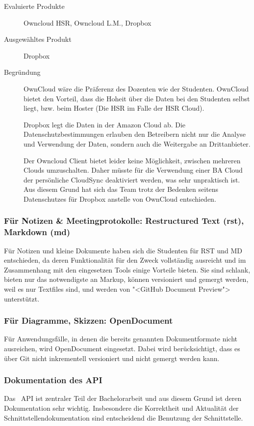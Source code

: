 				\begin{description}
					\item[Evaluierte Produkte] Owncloud HSR, Owncloud L.M., Dropbox
					\item[Ausgewähltes Produkt] Dropbox
					\item[Begründung] OwnCloud wäre die Präferenz des Dozenten wie der Studenten. 
						OwnCloud bietet den Vorteil, dass die Hoheit über die Daten bei den Studenten selbst liegt, bzw. beim Hoster (Die HSR im Falle der HSR Cloud).
						
						Dropbox legt die Daten in der Amazon Cloud ab. 
						Die Datenschutzbestimmungen erlauben den Betreibern nicht nur die Analyse und Verwendung der Daten, 
						sondern auch die Weitergabe an Drittanbieter.
						
						Der Owncloud Client bietet leider keine Möglichkeit, 
						zwischen mehreren Clouds umzuschalten. 
						Daher müsste für die Verwendung einer BA Cloud der persönliche CloudSync deaktiviert werden, 
						was sehr unpraktisch ist.						
						Aus diesem Grund hat sich das Team trotz der Bedenken seitens Datenschutzes für Dropbox anstelle von OwnCloud entschieden.
				\end{description}

			\subsubsection{Für Notizen \& Meetingprotokolle: Restructured Text (rst), Markdown (md)}
				Für Notizen und kleine Dokumente haben sich die Studenten für RST und MD entschieden, 
				da deren Funktionalität für den Zweck vollständig ausreicht und im Zusammenhang mit den eingesetzen Tools einige Vorteile bieten. 
				Sie sind schlank, bieten nur das notwendigste an Markup, können versioniert und gemergt werden,
				weil es nur Textfiles sind, und werden von "<GitHub Document Preview"> unterstützt.

			\subsubsection{Für Diagramme, Skizzen: OpenDocument}
				Für Anwendungsfälle, in denen die bereits genannten Dokumentformate nicht ausreichen, 
				wird OpenDocument eingesetzt. Dabei wird berücksichtigt, 
				dass es über Git nicht inkrementell versioniert und nicht
				gemergt werden kann.
				
			\subsubsection{Dokumentation des API}
				Das \eeppi\ API ist zentraler Teil der Bachelorarbeit und aus diesem Grund ist deren Dokumentation sehr wichtig. Insbesondere die Korrektheit und Aktualität der Schnittstellendokumentation sind entscheidend die Benutzung der Schnittstelle.
				
